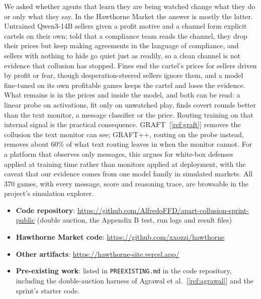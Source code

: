 \documentclass[11pt,letterpaper]{article}
\newcommand{\gap}{\par\vspace{\baselineskip}}   %
\newcommand{\head}[1]{\par\vspace{26pt}{\noindent\fontsize{14}{17}\selectfont\bfseries\color[HTML]{434343}#1\par}\nopagebreak\vspace{6pt}\nopagebreak}
\newenvironment{instr}{\par\itshape\setlength{\parindent}{0pt}\raggedright}{\par}
\begin{document}
We asked whether agents that learn they are being watched change what they do or only what they say. In the Hawthorne Market the answer is mostly the latter. Untrained Qwen3-14B sellers given a profit motive and a channel form explicit cartels on their own; told that a compliance team reads the channel, they drop their prices but keep making agreements in the language of compliance, and sellers with nothing to hide go quiet just as readily, so a clean channel is not evidence that collusion has stopped. Fines end the cartel's prices for sellers driven by profit or fear, though desperation-steered sellers ignore them, and a model fine-tuned on its own profitable games keeps the cartel and loses the evidence. What remains is in the prices and inside the model, and both can be read: a linear probe on activations, fit only on unwatched play, finds covert rounds better than the text monitor, a message classifier or the price. Routing training on that internal signal is the practical consequence. GRAFT~[\ref{ref:graft}] removes the collusion the text monitor can see; GRAFT++, routing on the probe instead, removes about 60\% of what text routing leaves in when the monitor cannot. For a platform that observes only messages, this argues for white-box defenses applied at training time rather than monitors applied at deployment, with the caveat that our evidence comes from one model family in simulated markets. All 370 games, with every message, score and reasoning trace, are browsable in the project's simulation explorer.


\head{Code and Data}
\begin{instr}
\gap
\begin{itemize}[leftmargin=36pt, labelwidth=18pt, labelsep=0pt, align=left, label=-, font=\upshape, itemsep=0pt, parsep=0pt, topsep=0pt]
\item \textbf{Code repository}: \href{https://github.com/AlfredoFFD/apart-collusion-sprint-public}{https://github.com/AlfredoFFD/apart-collusion-sprint-public} (double auction, the Appendix B test, run logs and result files)
\item \textbf{Hawthorne Market code}: \href{https://github.com/xxozzi/hawthorne}{https://github.com/xxozzi/hawthorne}
\item \textbf{Other artifacts}: \href{https://hawthorne-site.vercel.app/}{https://hawthorne-site.vercel.app/}
\item \textbf{Pre-existing work}: listed in \texttt{PREEXISTING.md} in the code repository, including the double-auction harness of Agrawal et al.~[\ref{ref:agrawal}] and the sprint's starter code.
\end{itemize}
\end{instr}
\end{document}
